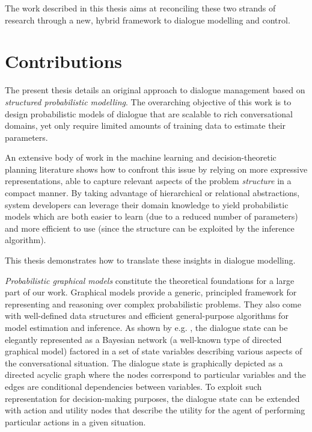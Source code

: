 The work described in this thesis aims at reconciling these two strands of research through a new, hybrid framework to dialogue modelling and control. 

\section{Contributions}

The present thesis details an original approach to dialogue management based on \textit{structured probabilistic modelling}.  The overarching objective of this work is to design probabilistic models of dialogue that are scalable to rich conversational domains, yet only require limited amounts of training data to estimate their parameters.

An extensive body of work in the machine learning and decision-theoretic planning literature shows how to confront this issue by relying on more expressive representations, able to capture relevant aspects of the problem \textit{structure} in a compact manner. By taking advantage of hierarchical or relational abstractions, system developers can leverage their domain knowledge to yield probabilistic models which are both easier to learn (due to a reduced number of parameters) and more efficient to use (since the structure can be exploited by the inference algorithm).  

This thesis demonstrates how to translate these insights in dialogue modelling. 

\textit{Probabilistic graphical models} \citep{Koller+Friedman:09} constitute the theoretical foundations for a large part of our work.  Graphical models provide a generic, principled framework for representing and reasoning over complex probabilistic problems. They also come with well-defined data structures and efficient general-purpose algorithms for model estimation and inference.  As shown  by e.g. \cite{Thomson:2010:BUD:1772996.1773040}, the dialogue state can be elegantly represented as a Bayesian network (a well-known type of directed graphical model) factored in a set of state variables describing various aspects of the conversational situation.  The dialogue state is graphically depicted as a directed acyclic graph where the nodes correspond to particular variables and the edges are conditional dependencies between variables. To exploit such representation for decision-making purposes, the dialogue state can be extended with action and utility nodes that describe the utility for the agent of performing particular actions in a given situation. 

